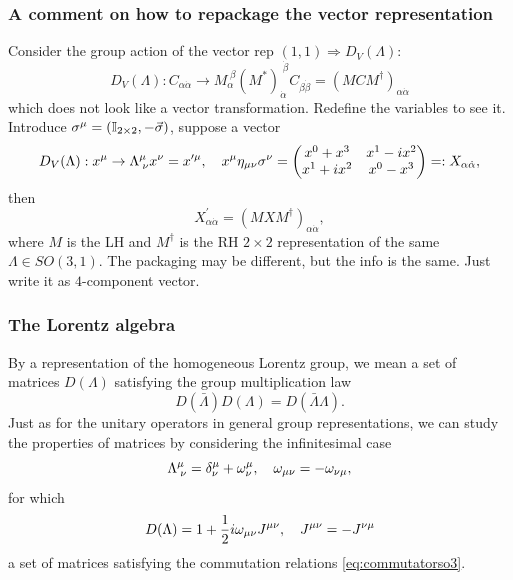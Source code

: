 \subsubsection{A comment on how to repackage the vector representation}
Consider the group action of the vector rep $(1,1)\Rightarrow D_V(\Lambda)$:
\begin{equation*}
	D_V(\Lambda) : C_{\alpha \dot{\alpha}} \rightarrow M^{\;\beta}_\alpha (M^*)^{\;\dot{\beta}}_{\dot{\alpha}} C_{\beta \dot{\beta}} = (M C M^\dagger)_{\alpha \dot{\alpha}}
\end{equation*}
which does not look like a vector transformation. Redefine the variables to see it. Introduce $\sigma^\mu=(\mathbb{I}_{2\times 2}, - \vec{\sigma})$, suppose a vector
\begin{equation*}
	D_V(\Lambda):x^\mu \rightarrow \Lambda^\mu_{\;\nu} x^\nu = x^{\prime \mu},\quad x^\mu \eta_{\mu \nu} \sigma^\nu =\begin{pmatrix}
		x^0+x^3&x^1-ix^2\\
		x^1+ix^2 & x^0-x^3\\
	\end{pmatrix}
=:X_{\alpha \dot{\alpha}},
\end{equation*}
then
\begin{equation*}
X^\prime_{\alpha \dot{\alpha}} = (M X M^\dagger)_{\alpha \dot{\alpha}},
\end{equation*}
where $M$ is the LH and $M^\dagger$ is the RH $2\times 2$ representation of the same $\Lambda \in SO(3,1)$. The packaging may be different, but the info is the same. Just write it as $4$-component vector.




\subsubsection{The Lorentz algebra}
By a representation of the homogeneous Lorentz group, we mean a set of matrices $D(\Lambda)$ satisfying the group multiplication law 
\begin{equation*}
	D(\bar{ \Lambda}) D(\Lambda) = D(\bar{ \Lambda} \Lambda).
\end{equation*}
Just as for the unitary operators in general group representations, we can study the properties of matrices by considering the infinitesimal case
\begin{equation}
\Lambda^\mu_{\;\nu} = \delta^\mu_\nu + \omega^\mu_\nu,\quad \omega_{\mu \nu}=-\omega_{\nu\mu},
\end{equation}
for which
\begin{equation}
\label{eq:spinortrafo}
D(\Lambda) = 1 + \frac{1}{2} i \omega_{\mu \nu}  J^{\mu \nu},\quad J^{\mu \nu} = - J^{\nu \mu} 
\end{equation}
a set of matrices satisfying the commutation relations \ref{eq:commutatorso3}.











